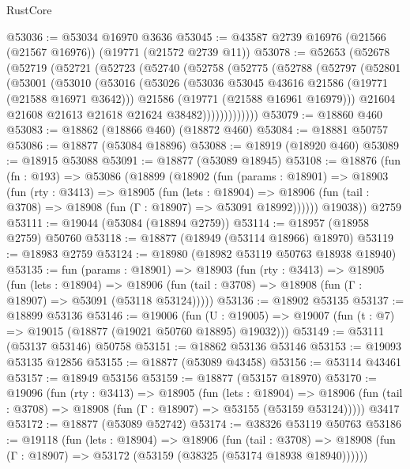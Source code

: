 \begin{lexlean}{RustCore}
\begin{coremodule}
@53036 := @53034 @16970 @3636
@53045 := @43587 @2739 @16976 (@21566 (@21567 @16976)) (@19771 (@21572 @2739 @11))
@53078 := @52653
    (@52678
      (@52719
        (@52721
          (@52723
            (@52740
              (@52758
                (@52775
                  (@52788
                    (@52797
                      (@52801
                        (@53001
                          (@53010
                            (@53016
                              (@53026
                                (@53036 @53045 @43616 @21586 (@19771 (@21588 @16971 @3642)))
                                @21586
                                (@19771 (@21588 @16961 @16979)))
                              @21604
                              @21608
                              @21613
                              @21618
                              @21624
                              @38482)))))))))))))
@53079 := @18860 @460
@53083 := @18862 (@18866 @460) (@18872 @460)
@53084 := @18881 @50757
@53086 := @18877 (@53084 @18896)
@53088 := @18919 (@18920 @460)
@53089 := @18915 @53088
@53091 := @18877 (@53089 @18945)
@53108 := @18876
    (fun (fn : @193) =>
    @53086
      (@18899
        (@18902
          (fun (params : @18901) =>
          @18903
            (fun (rty : @3413) =>
            @18905
              (fun (lets : @18904) =>
              @18906 (fun (tail : @3708) => @18908 (fun (Γ : @18907) => @53091 @18992))))))
        @19038))
    @2759
@53111 := @19044 (@53084 (@18894 @2759))
@53114 := @18957 (@18958 @2759) @50760
@53118 := @18877 (@18949 (@53114 @18966) @18970)
@53119 := @18983 @2759
@53124 := @18980 (@18982 @53119 @50763 @18938 @18940)
@53135 := fun (params : @18901) =>
  @18903
    (fun (rty : @3413) =>
    @18905
      (fun (lets : @18904) =>
      @18906 (fun (tail : @3708) => @18908 (fun (Γ : @18907) => @53091 (@53118 @53124)))))
@53136 := @18902 @53135
@53137 := @18899 @53136
@53146 := @19006
    (fun (U : @19005) => @19007 (fun (t : @7) => @19015 (@18877 (@19021 @50760 @18895) @19032)))
@53149 := @53111 (@53137 @53146) @50758
@53151 := @18862 @53136 @53146
@53153 := @19093 @53135 @12856
@53155 := @18877 (@53089 @43458)
@53156 := @53114 @43461
@53157 := @18949 @53156
@53159 := @18877 (@53157 @18970)
@53170 := @19096
    (fun (rty : @3413) =>
    @18905
      (fun (lets : @18904) =>
      @18906 (fun (tail : @3708) => @18908 (fun (Γ : @18907) => @53155 (@53159 @53124)))))
    @3417
@53172 := @18877 (@53089 @52742)
@53174 := @38326 @53119 @50763
@53186 := @19118
    (fun (lets : @18904) =>
    @18906
      (fun (tail : @3708) =>
      @18908 (fun (Γ : @18907) => @53172 (@53159 (@38325 (@53174 @18938 @18940))))))

\end{coremodule}
\end{lexlean}
